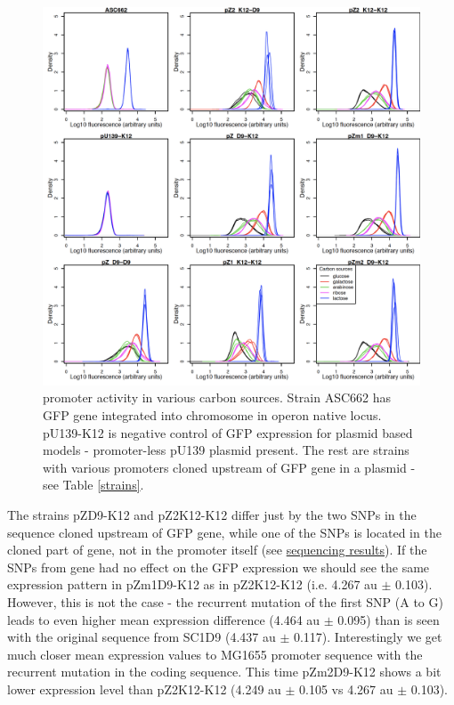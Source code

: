 \begin{figure}[ht!]
  \centering
  \includegraphics[scale=0.4]{text/Pictures/lacZassay.png}
	\caption{ promoter activity in various carbon sources. Strain ASC662 has GFP gene integrated into chromosome in  operon native locus. pU139-K12 is negative control of GFP expression for plasmid based models - promoter-less pU139 plasmid present. The rest are strains with various  promoters cloned upstream of GFP gene in a plasmid - see Table \ref{strains}.}
	\label{lacZassay}
\end{figure}

The strains pZ\textunderscore D9-K12 and pZ2\textunderscore K12-K12 differ just by the two SNPs in the sequence cloned upstream of GFP gene, while one of the SNPs is located in the cloned part of  gene, not in the promoter itself (see \hyperlink{SeqRes}{sequencing results}).
If the SNPs from  gene had no effect on the GFP expression we should see the same expression pattern in pZm1\textunderscore D9-K12 as in pZ2\textunderscore K12-K12 (i.e. 4.267 au $\pm$ 0.103).
However, this is not the case - the recurrent mutation of the first SNP (A to G) leads to even higher mean expression difference (4.464 au $\pm$ 0.095) than is seen with the original sequence from SC1\textunderscore D9 (4.437 au $\pm$ 0.117).
Interestingly we get much closer mean expression values to MG1655 promoter sequence with the recurrent mutation in the  coding sequence.
This time pZm2\textunderscore D9-K12 shows a bit lower expression level than pZ2\textunderscore K12-K12 (4.249 au $\pm$ 0.105 vs 4.267 au $\pm$ 0.103).

